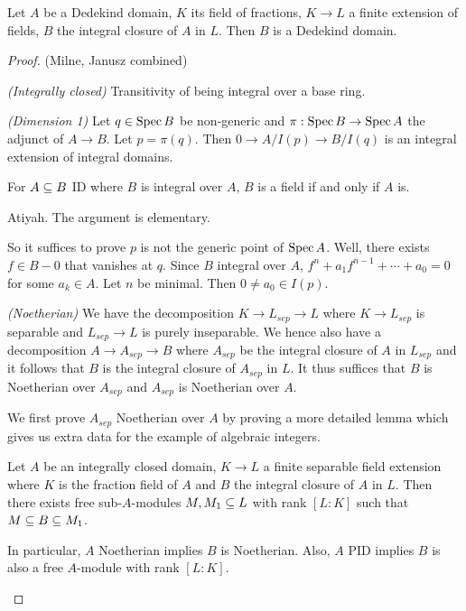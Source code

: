 \documentclass[./main.tex]{subfiles}
\begin{document}
\begin{prop}
  
  Let $A$ be a Dedekind domain, 
  $K$ its field of fractions,
  $K \to L$ a finite extension of fields,
  $B$ the integral closure of $A$ in $L$.
  Then $B$ is a Dedekind domain. 
\end{prop}
\begin{proof}(Milne, Janusz combined)
  
  \textit{(Integrally closed)} Transitivity of being integral over a base ring.

  \textit{(Dimension 1)}
  Let $q \in \operatorname{Spec} B$ be non-generic and $\pi : \operatorname{Spec} B \to \operatorname{Spec} A$
  the adjunct of $A \to B$. 
  Let $p = \pi(q)$.
  Then $0 \to A/I(p) \to B/I(q)$ is an integral extension of integral domains.
  \begin{lem}
    For $A \subseteq B$ ID where $B$ is integral over $A$,
    $B$ is a field if and only if $A$ is.
    \begin{proof1}
      Atiyah. The argument is elementary. 
    \end{proof1}
  \end{lem}
  So it suffices to prove $p$ is not the generic point of $\operatorname{Spec} A$.
  Well, there exists $f \in B\minus 0$ that vanishes at $q$.
  Since $B$ integral over $A$, $f^n + a_1 f^{n - 1} + \cdots + a_0 = 0$
  for some $a_k \in A$.
  Let $n$ be minimal. Then $0 \neq a_0 \in I(p)$.

  \textit{(Noetherian)}
  We have the decomposition $K \to L_{sep} \to L$ where 
  $K \to L_{sep}$ is separable and $L_{sep} \to L$ is purely inseparable. 
  We hence also have a decomposition $A \to A_{sep} \to B$
  where $A_{sep}$ be the integral closure of $A$ in $L_{sep}$
  and it follows that $B$ is the integral closure of $A_{sep}$ in $L$.
  It thus suffices that $B$ is Noetherian over $A_{sep}$ and 
  $A_{sep}$ is Noetherian over $A$.

  We first prove $A_{sep}$ Noetherian over $A$ by 
  proving a more detailed lemma
  which gives us extra data for the example of algebraic integers. 
  \begin{lem}
    Let $A$ be an integrally closed domain, 
    $K \to L$ a finite separable field extension where 
    $K$ is the fraction field of $A$ and 
    $B$ the integral closure of $A$ in $L$.
    Then there exists free sub-$A$-modules $M, M_1 \subseteq L$ with rank $[L:K]$
    such that $M \subseteq B \subseteq M_1$.
    
    In particular, $A$ Noetherian implies $B$ is Noetherian. 
    Also, $A$ PID implies $B$ is also a free $A$-module with rank $[L:K]$.


\end{lem}
\end{proof}
\end{document}
